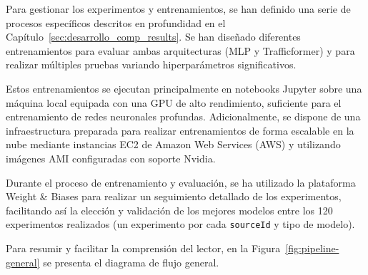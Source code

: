 Para gestionar los experimentos y entrenamientos, se han definido una serie de procesos específicos descritos en profundidad en el Capítulo~\ref{sec:desarrollo_comp_results}. Se han diseñado diferentes entrenamientos para evaluar ambas arquitecturas (MLP y Trafficformer) y para realizar múltiples pruebas variando hiperparámetros significativos.

Estos entrenamientos se ejecutan principalmente en notebooks Jupyter sobre una máquina local equipada con una GPU de alto rendimiento, suficiente para el entrenamiento de redes neuronales profundas. Adicionalmente, se dispone de una infraestructura preparada para realizar entrenamientos de forma escalable en la nube mediante instancias EC2 de Amazon Web Services (AWS) y utilizando imágenes AMI configuradas con soporte Nvidia.

Durante el proceso de entrenamiento y evaluación, se ha utilizado la plataforma Weight \& Biases para realizar un seguimiento detallado de los experimentos, facilitando así la elección y validación de los mejores modelos entre los 120 experimentos realizados (un experimento por cada \texttt{sourceId} y tipo de modelo).

Para resumir y facilitar la comprensión del lector, en la Figura~\ref{fig:pipeline-general} se presenta el diagrama de flujo general.

